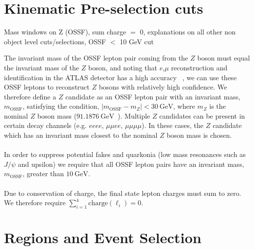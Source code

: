 \section{Kinematic Pre-selection cuts}
Mass windows on Z (OSSF), sum charge $=$ 0, explanations on all other non object level cuts/selections, OSSF $<$ 10 GeV cut


The invariant mass of the OSSF lepton pair coming from the $Z$ boson must equal the invariant mass of the $Z$ boson, and noting that $e$,$\mu$ reconstruction and identification in the ATLAS detector has a high accuracy ~\cite{}, we can use these OSSF leptons to reconstruct $Z$ bosons with relatively high confidence. We therefore define a $Z$ candidate as an OSSF lepton pair with an invariant mass, $m_{\text{OSSF}}$, satisfying the condition, $|m_{\text{OSSF}} - m_Z| <  \SI{30}{\GeV}$, where $m_Z$ is the nominal $Z$ boson mass ($\SI{91.1876}{\GeV}$~\cite{pdg}). Multiple $Z$ candidates can be present in certain decay channels (e.g. $eeee$, $\mu\mu ee$, $\mu \mu \mu \mu$). In these cases, the $Z$ candidate which has an invariant mass closest to the nominal $Z$ boson mass is chosen.\\\\
In order to suppress potential fakes and quarkonia (low mass resonances such as $J/\psi$ and upsilon) we require that all OSSF lepton pairs have an invariant mass, $m_{\text{OSSF}}$, greater than $\SI{10}{\GeV}$.\\\\
Due to conservation of charge, the final state lepton charges must sum to zero.\\ We therefore require $\displaystyle\sum_{i=1}^{4} \text{charge}(\ell_i) = 0$.



\section{Regions and Event Selection}
\label{sec:regionsAndEventSelection}


